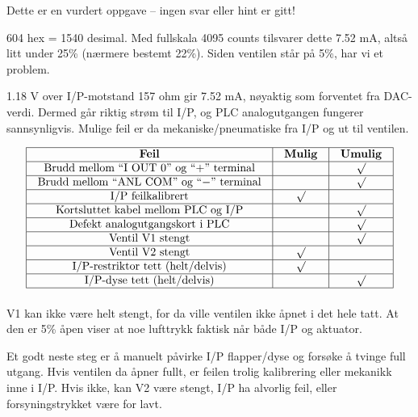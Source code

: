 
Dette er en vurdert oppgave -- ingen svar eller hint er gitt!







604 hex = 1540 desimal. Med fullskala 4095 counts tilsvarer dette 7.52 mA, altså litt under 25\% (nærmere bestemt 22\%). Siden ventilen står på 5\%, har vi et problem.

\vskip 10pt

1.18 V over I/P-motstand 157 ohm gir 7.52 mA, nøyaktig som forventet fra DAC-verdi. Dermed går riktig strøm til I/P, og PLC analogutgangen fungerer sannsynligvis. Mulige feil er da mekaniske/pneumatiske fra I/P og ut til ventilen.


$$\vbox{\offinterlineskip
\halign{\strut
\vrule \quad\hfil # \ \hfil &
\vrule \quad\hfil # \ \hfil &
\vrule \quad\hfil # \ \hfil \vrule \cr
\noalign{\hrule}
%
{\bf Feil} & {\bf Mulig} & {\bf Umulig} \cr
%
\noalign{\hrule}
%
Brudd mellom ``I OUT 0'' og ``+'' terminal &  & $\surd$ \cr
%
\noalign{\hrule}
%
Brudd mellom ``ANL COM'' og ``$-$'' terminal &  & $\surd$ \cr
%
\noalign{\hrule}
%
I/P feilkalibrert & $\surd$ &  \cr
%
\noalign{\hrule}
%
Kortsluttet kabel mellom PLC og I/P &  & $\surd$ \cr
%
\noalign{\hrule}
%
Defekt analogutgangskort i PLC &  & $\surd$ \cr
%
\noalign{\hrule}
%
Ventil V1 stengt &  & $\surd$ \cr
%
\noalign{\hrule}
%
Ventil V2 stengt & $\surd$ &  \cr
%
\noalign{\hrule}
%
I/P-restriktor tett (helt/delvis) & $\surd$ &  \cr
%
\noalign{\hrule}
%
I/P-dyse tett (helt/delvis) &  & $\surd$ \cr
%
\noalign{\hrule}
} %
}$$ %

V1 kan ikke være helt stengt, for da ville ventilen ikke åpnet i det hele tatt. At den er 5\% åpen viser at noe lufttrykk faktisk når både I/P og aktuator.

\vskip 10pt

Et godt neste steg er å manuelt påvirke I/P flapper/dyse og forsøke å tvinge full utgang. Hvis ventilen da åpner fullt, er feilen trolig kalibrering eller mekanikk inne i I/P. Hvis ikke, kan V2 være stengt, I/P ha alvorlig feil, eller forsyningstrykket være for lavt.


